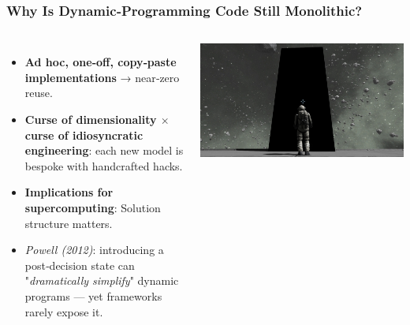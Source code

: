 \documentclass[10pt]{beamer}
\begin{document}
\begin{frame}
    \frametitle{Why Is Dynamic‑Programming Code Still Monolithic?}
  
    \begin{columns}[T]
      \begin{itemize}\setlength\itemsep{4pt}
        \item \textbf{Ad hoc, one‑off, copy‑paste implementations} → near‑zero reuse.  
        \item \textbf{Curse of dimensionality $\times$ curse of idiosyncratic engineering}:  
              each new model is bespoke with handcrafted hacks.
        \item \textbf{Implications for supercomputing}: Solution structure matters.
        \item \textit{Powell (2012)}: introducing a post‑decision state  
              can "\emph{dramatically simplify}" dynamic programs —  
              yet frameworks rarely expose it.
      \end{itemize}
  

      \centering
      \includegraphics[width=\columnwidth, trim=350 0 350 0, clip]{space1.jpg}
  
    \end{columns}
\end{frame}
\end{document}
